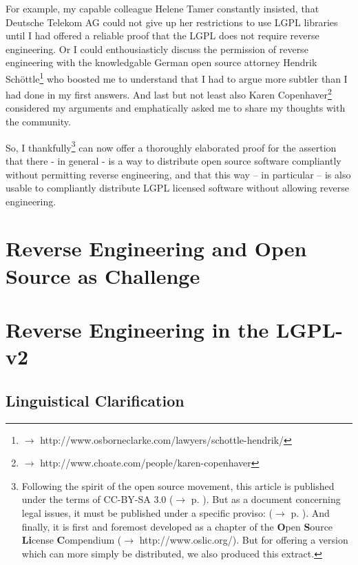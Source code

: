 \documentclass[DIV=calc,BCOR=5mm,12pt,headings=small,oneside,toc=bib]{scrartcl}
\begin{document}
For example, my capable colleague Helene Tamer constantly insisted, that
Deutsche Telekom AG could not give up her restrictions to use LGPL libraries
until I had offered a reliable proof that the LGPL does not require reverse
engineering. Or I could enthousiasticly discuss the permission of reverse
engineering with the knowledgable German open source attorney Hendrik
Schöttle\footnote{$\rightarrow$
http://www.osborneclarke.com/lawyers/schottle-hendrik/} who boosted me to
understand that I had to argue more subtler than I had done in my first
answers. And last but not least also Karen Copenhaver\footnote{$\rightarrow$
http://www.choate.com/people/karen-copenhaver} considered my arguments and
emphatically asked me to share my thoughts with the community.

So, I thankfully\footnote{Following the spirit of the open source movement, this
article is published under the terms of CC-BY-SA 3.0 ($\rightarrow$ p.
\pageref{License}). But as a document concerning legal issues, it must  be
published under a specific proviso: ($\rightarrow$ p. \pageref{Disclaimer}). And
finally, it is first and foremost developed as a chapter of the \textbf{O}pen
\textbf{S}ource \textbf{Li}cense \textbf{C}ompendium ($\rightarrow$
http://www.oslic.org/). But for offering a version which can more simply be
distributed, we also produced this extract.} can now offer a thoroughly
elaborated proof for the assertion that there - in general - is a way to
distribute open source software compliantly without permitting reverse
engineering, and that this way -- in particular -- is also usable to compliantly
distribute LGPL licensed software without allowing reverse engineering.

\footnotesize
\tableofcontents
\normalsize

\section{Reverse Engineering and Open Source as Challenge}

\section{Reverse Engineering in the LGPL-v2}

\subsection{Linguistical Clarification}

\end{document}
